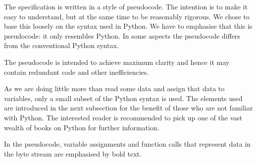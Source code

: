 The specification is written in a style of pseudocode. The intention is
to make it easy to understand, but at the same time to be reasonably
rigorous. We chose to base this loosely on the syntax used in Python. We
have to emphasise that this is pseudocode: it only resembles Python. In
some aspects the pseudocode differs from the conventional Python syntax.

The pseudocode is intended to achieve maximum clarity and hence it may
contain redundant code and other inefficiencies.

As we are doing little more than read some data and assign that data to
variables, only a small subset of the Python syntax is used. The
elements used are introduced in the next subsection for the benefit of
those who are not familiar with Python. The interested reader is
recommended to pick up one of the vast wealth of books on Python for
further information.

In the pseudocode, variable assignments and function calls that
represent data in the byte stream are emphasised by bold text.
